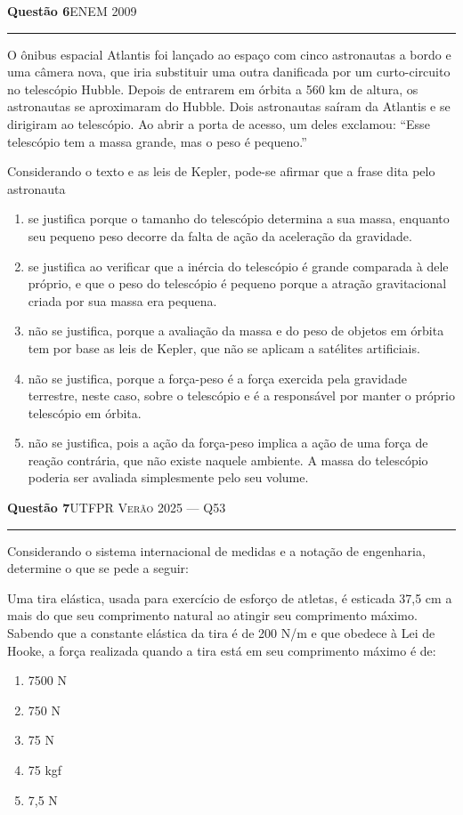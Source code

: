 \documentclass[11pt,a4paper]{article}
\newcommand{\fonte}[1]{{\small\scshape\color{grafite}#1}}
\newenvironment{questao}[2]{%
  \needspace{6\baselineskip}
  \par\addvspace{1.6em}
  {\large\bfseries\color{vinho}Quest\~ao #1}\hfill #2\\[-0.55em]
  {\color{black!25}\rule{\linewidth}{0.4pt}}
  \par\nobreak\smallskip
}{\par\addvspace{0.4em}}
\begin{document}
\begin{questao}{6}{\fonte{ENEM 2009}}
O \^onibus espacial Atlantis foi lan\c{c}ado ao espa\c{c}o com cinco
astronautas a bordo e uma c\^amera nova, que iria substituir uma outra
danificada por um curto-circuito no telesc\'opio Hubble. Depois de
entrarem em \'orbita a 560 km de altura, os astronautas se aproximaram
do Hubble. Dois astronautas sa\'iram da Atlantis e se dirigiram ao
telesc\'opio. Ao abrir a porta de acesso, um deles exclamou: ``Esse
telesc\'opio tem a massa grande, mas o peso \'e pequeno.''

Considerando o texto e as leis de Kepler, pode-se afirmar que a frase
dita pelo astronauta
\begin{enumerate}
  \item se justifica porque o tamanho do telesc\'opio determina a sua
        massa, enquanto seu pequeno peso decorre da falta de a\c{c}\~ao
        da acelera\c{c}\~ao da gravidade.
  \item se justifica ao verificar que a in\'ercia do telesc\'opio \'e
        grande comparada \`a dele pr\'oprio, e que o peso do
        telesc\'opio \'e pequeno porque a atra\c{c}\~ao gravitacional
        criada por sua massa era pequena.
  \item n\~ao se justifica, porque a avalia\c{c}\~ao da massa e do peso
        de objetos em \'orbita tem por base as leis de Kepler, que
        n\~ao se aplicam a sat\'elites artificiais.
  \item n\~ao se justifica, porque a for\c{c}a-peso \'e a for\c{c}a
        exercida pela gravidade terrestre, neste caso, sobre o
        telesc\'opio e \'e a respons\'avel por manter o pr\'oprio
        telesc\'opio em \'orbita.
  \item n\~ao se justifica, pois a a\c{c}\~ao da for\c{c}a-peso implica
        a a\c{c}\~ao de uma for\c{c}a de rea\c{c}\~ao contr\'aria, que
        n\~ao existe naquele ambiente. A massa do telesc\'opio poderia
        ser avaliada simplesmente pelo seu volume.
\end{enumerate}
\end{questao}

\begin{questao}{7}{\fonte{UTFPR Ver\~ao 2025 --- Q53}}
Considerando o sistema internacional de medidas e a nota\c{c}\~ao de
engenharia, determine o que se pede a seguir:

Uma tira el\'astica, usada para exerc\'icio de esfor\c{c}o de atletas,
\'e esticada 37,5 cm a mais do que seu comprimento natural ao atingir
seu comprimento m\'aximo. Sabendo que a constante el\'astica da tira \'e
de 200 N/m e que obedece \`a Lei de Hooke, a for\c{c}a realizada quando
a tira est\'a em seu comprimento m\'aximo \'e de:
\begin{enumerate}
  \item 7500 N
  \item 750 N
  \item 75 N
  \item 75 kgf
  \item 7,5 N
\end{enumerate}
\end{questao}
\end{document}
